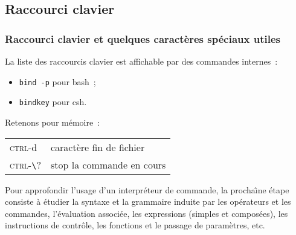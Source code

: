 \subsection{Raccourci clavier}
\begin{frame}[fragile]
  \frametitle{Raccourci clavier et quelques caract\`eres sp\'eciaux
    utiles} La liste des raccourcis clavier est affichable par des
  commandes internes~:
  \begin{itemize}
  \item \verb?bind -p? pour bash~;
  \item \verb?bindkey? pour csh.
  \end{itemize}
  \par\medskip
  Retenons pour m\'emoire~:
  \begin{center}
    \begin{tabular}{ll}
      \textsc{ctrl}-d & caract\`ere fin de fichier \\
      \textsc{ctrl-}\verb?\? & stop la commande en cours
    \end{tabular}
  \end{center}
  Pour approfondir l'usage d'un interpr\'eteur de commande, la
  procha\^\i{}ne \'etape consiste \`a \'etudier la syntaxe et la
  grammaire induite par les op\'erateurs et les commandes,
  l'\'evaluation associ\'ee, les expressions (simples et compos\'ees),
  les instructions de contr\^ole, les fonctions et le passage de
  param\`etres, etc.
\end{frame}

